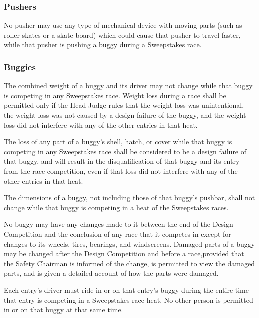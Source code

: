 \documentclass[openany]{book}
\begin{document}
\subsubsection{Pushers}

No pusher may use any type of mechanical device with moving parts (such as roller skates or a skate board) which could cause that pusher to travel faster, while that pusher is pushing a buggy during a Sweepstakes race.

\subsubsection{Buggies}

The combined weight of a buggy and its driver may not change while that buggy is competing in any Sweepstakes race. Weight loss during a race shall be permitted only if the Head Judge rules that the weight loss was unintentional, the weight loss was not caused by a design failure of the buggy, and the weight loss did not interfere with any of the other entries in that heat.

The loss of any part of a buggy's shell, hatch, or cover while that buggy is competing in any Sweepstakes race shall be considered to be a design failure of that buggy, and will result in the disqualification of that buggy and its entry from the race competition, even if that loss did not interfere with any of the other entries in that heat.

The dimensions of a buggy, not including those of that buggy's pushbar, shall not change while that buggy is competing in a heat of the Sweepstakes races.

No buggy may have any changes made to it between the end of the Design Competition and the conclusion of any race that it competes in except for changes to its wheels, tires, bearings, and windscreens. Damaged parts of a buggy may be changed after the Design Competition and before a race,provided that the Safety Chairman is informed of the change, is permitted to view the damaged parts, and is given a detailed account of how the parts were damaged.

Each entry's driver must ride in or on that entry's buggy during the entire time that entry is competing in a Sweepstakes race heat. No other person is permitted in or on that buggy at that same time.
\end{document}
